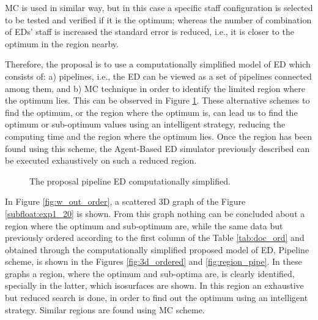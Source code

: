\documentclass[11pt]{article} %
\begin{document}
MC is used in similar way, but in this case a specific staff configuration is selected to be tested and verified if it is the optimum; 
whereas the number of combination of EDs' staff  is increased the standard error is reduced, i.e., it is closer to the optimum in the 
region nearby.

Therefore, the proposal is to use a computationally simplified model of ED which consists of: a) pipelines, i.e., the ED can be viewed 
as a set of pipelines connected among them, and  b) MC technique in order to identify the limited region where the optimum lies. This 
can be observed in Figure \ref{fig:pipeline}. These alternative schemes to find the optimum, or the region where the optimum is, can 
lead us to find the optimum or sub-optimum values using an intelligent strategy, reducing the computing time and the region where 
the optimum lies. Once the region has been found using this scheme, the Agent-Based ED simulator previously described can be 
executed exhaustively on such a reduced region.


\begin{figure}[htb!]
{\par}
\caption{The proposal pipeline ED computationally simplified.}
\label{fig:pipeline}
\end{figure}

In  Figure \ref{fig:w_out_order}, a scattered 3D graph of the Figure \ref{subfloat:exp1_20} is shown. From this graph nothing can 
be concluded about a region where the optimum and sub-optimum are, while the same data but previously ordered according to the 
first column of the  Table \ref{tab:doc_ord} and obtained through the computationally simplified proposed model of ED, Pipeline 
scheme, is shown in the Figures \ref{fig:3d_ordered} and \ref{fig:region_pipe}. In these graphs a region, where the optimum and 
sub-optima are, is clearly identified, specially in the latter, which isosurfaces are shown. In this region an exhaustive but reduced 
search is done, in order to find out the optimum using an intelligent strategy. Similar regions are found using MC scheme. 
\end{document}
